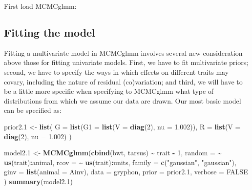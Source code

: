 \documentclass[
  12pt,
]{book}
\newenvironment{Shaded}{\begin{snugshade}}{\end{snugshade}}
\newcommand{\DataTypeTok}[1]{\textcolor[rgb]{0.13,0.29,0.53}{#1}}
\newcommand{\DecValTok}[1]{\textcolor[rgb]{0.00,0.00,0.81}{#1}}
\newcommand{\FloatTok}[1]{\textcolor[rgb]{0.00,0.00,0.81}{#1}}
\newcommand{\KeywordTok}[1]{\textcolor[rgb]{0.13,0.29,0.53}{\textbf{#1}}}
\newcommand{\NormalTok}[1]{#1}
\newcommand{\OperatorTok}[1]{\textcolor[rgb]{0.81,0.36,0.00}{\textbf{#1}}}
\newcommand{\OtherTok}[1]{\textcolor[rgb]{0.56,0.35,0.01}{#1}}
\newcommand{\StringTok}[1]{\textcolor[rgb]{0.31,0.60,0.02}{#1}}
\begin{document}
First load MCMCglmm:

\begin{Shaded}
\end{Shaded}

\hypertarget{fitting-the-model}{%
\subsection{Fitting the model}\label{fitting-the-model}}

Fitting a multivariate model in MCMCglmm involves several new consideration above those for fitting univariate models. First, we have to fit multivariate priors; second, we have to specify the ways in which effects on different traits may covary, including the nature of residual (co)variation; and third, we will have to be a little more specific when specifying to MCMCglmm what type of distributions from which we assume our data are drawn. Our most basic model can be specified as:

\begin{Shaded}
\begin{Highlighting}[]
\NormalTok{prior2}\FloatTok{.1}\NormalTok{ \textless{}{-}}\StringTok{ }\KeywordTok{list}\NormalTok{(}
  \DataTypeTok{G =} \KeywordTok{list}\NormalTok{(}\DataTypeTok{G1 =} \KeywordTok{list}\NormalTok{(}\DataTypeTok{V =} \KeywordTok{diag}\NormalTok{(}\DecValTok{2}\NormalTok{), }\DataTypeTok{nu =} \FloatTok{1.002}\NormalTok{)),}
  \DataTypeTok{R =} \KeywordTok{list}\NormalTok{(}\DataTypeTok{V =} \KeywordTok{diag}\NormalTok{(}\DecValTok{2}\NormalTok{), }\DataTypeTok{nu =} \FloatTok{1.002}\NormalTok{)}
\NormalTok{)}

\NormalTok{model2}\FloatTok{.1}\NormalTok{ \textless{}{-}}\StringTok{ }\KeywordTok{MCMCglmm}\NormalTok{(}\KeywordTok{cbind}\NormalTok{(bwt, tarsus) }\OperatorTok{\textasciitilde{}}\StringTok{ }\NormalTok{trait }\OperatorTok{{-}}\StringTok{ }\DecValTok{1}\NormalTok{,}
  \DataTypeTok{random =} \OperatorTok{\textasciitilde{}}\StringTok{ }\KeywordTok{us}\NormalTok{(trait)}\OperatorTok{:}\NormalTok{animal,}
  \DataTypeTok{rcov =} \OperatorTok{\textasciitilde{}}\StringTok{ }\KeywordTok{us}\NormalTok{(trait)}\OperatorTok{:}\NormalTok{units,}
  \DataTypeTok{family =} \KeywordTok{c}\NormalTok{(}\StringTok{"gaussian"}\NormalTok{, }\StringTok{"gaussian"}\NormalTok{),}
  \DataTypeTok{ginv =} \KeywordTok{list}\NormalTok{(}\DataTypeTok{animal =}\NormalTok{ Ainv),}
  \DataTypeTok{data =}\NormalTok{ gryphon, }\DataTypeTok{prior =}\NormalTok{ prior2}\FloatTok{.1}\NormalTok{, }\DataTypeTok{verbose =} \OtherTok{FALSE}
\NormalTok{)}
\KeywordTok{summary}\NormalTok{(model2}\FloatTok{.1}\NormalTok{)}
\end{Highlighting}
\end{Shaded}
\end{document}
